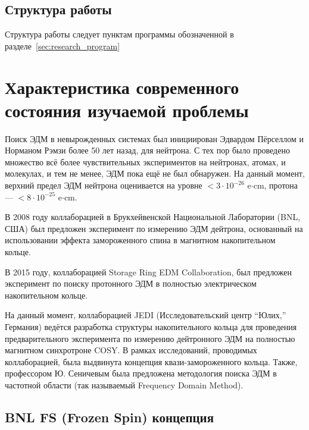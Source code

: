 \documentclass{report}
\begin{document}
\section{Структура работы}
Структура работы следует пунктам программы обозначенной в разделе~\ref{sec:research_program}

\chapter{Характеристика современного состояния изучаемой проблемы}
Поиск ЭДМ в невырожденных системах был инициирован Эдвардом Пёрселлом
и Норманом Рэмзи более 50 лет назад, для нейтрона. С тех пор было
проведено множество всё более чувствительных экспериментов на
нейтронах, атомах, и молекулах, и тем не менее, ЭДМ пока ещё не был
обнаружен. На данный момент, верхний предел ЭДМ нейтрона оценивается
на уровне $<3\cdot 10^{-26}$ e$\cdot$cm, протона --- $<8\cdot
10^{-25}$ e$\cdot$cm.~\citep[стр.~9]{Pretz:presentation}

В 2008 году коллаборацией в Брукхейвенской Национальной Лаборатории (BNL, США) был предложен эксперимент по измерению ЭДМ дейтрона, основанный на использовании эффекта замороженного спина в магнитном накопительном кольце.~\cite{BNL:Deuteron2008} 

В 2015 году, коллаборацией Storage Ring EDM Collaboration, был предложен эксперимент по поиску протонного ЭДМ в полностью электрическом накопительном кольце.~\cite{BNL:Proton}

На данный момент, коллаборацией JEDI (Исследовательский центр ``Юлих,'' Германия) ведётся разработка структуры накопительного кольца для проведения предварительного эксперимента по измерению дейтронного ЭДМ на полностью магнитном синхротроне COSY. В рамках исследований, проводимых коллаборацией, была выдвинута концепция квази-замороженного кольца. Также, профессором Ю. Сеничевым была предложена методология поиска ЭДМ в частотной области (так называемый Frequency Domain Method).

\section{BNL FS (Frozen Spin) концепция}
\end{document}
